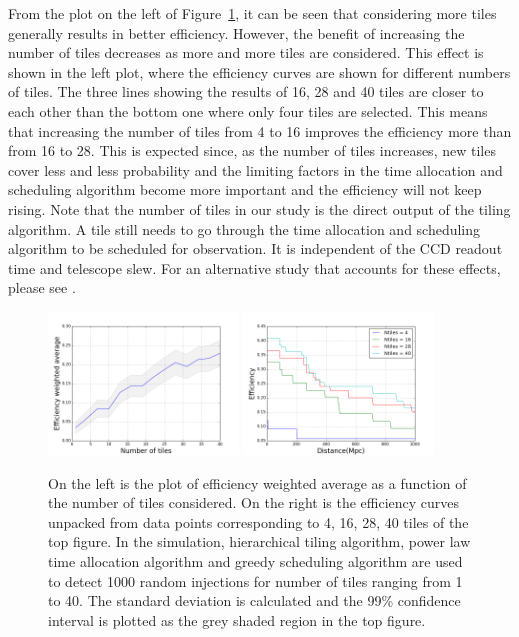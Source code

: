 \documentclass[twocolumn]{aastex62}
\begin{document}
From the plot on the left of Figure~\ref{fig:eff_ntiles}, it can be seen that considering more tiles generally results in better efficiency. However, the benefit of increasing the number of tiles decreases as more and more tiles are considered. This effect is shown in the left plot, where the efficiency curves are shown for different numbers of tiles. The three lines showing the results of 16, 28 and 40 tiles are closer to each other than the bottom one where only four tiles are selected. This means that increasing the number of tiles from 4 to 16 improves the efficiency more than from 16 to 28. This is expected since, as the number of tiles increases, new tiles cover less and less probability and the limiting factors in the time allocation and scheduling algorithm become more important and the efficiency will not keep rising.
Note that the number of tiles in our study is the direct output of the tiling algorithm. A tile still needs to go through the time allocation and scheduling algorithm to be scheduled for observation. It is independent of the CCD readout time and telescope slew. For an alternative study that accounts for these effects, please see \cite{ChHu2017}.
\begin{figure}[t]
    \centering
    \includegraphics[width=0.45\textwidth]{plots/eff_ntiles.png}
    \includegraphics[width=0.45\textwidth]{plots/eff_ntiles_curves.png}
    \caption{On the left is the plot of efficiency weighted average as a function of the number of tiles considered. On the right is the efficiency curves unpacked from data points corresponding to 4, 16, 28, 40 tiles of the top figure. In the simulation, hierarchical tiling algorithm, power law time allocation algorithm and greedy scheduling algorithm are used to detect 1000 random injections for number of tiles ranging from 1 to 40. The standard deviation is calculated and the 99\% confidence interval is plotted as the grey shaded region in the top figure.}
    \label{fig:eff_ntiles}
\end{figure}
\end{document}
